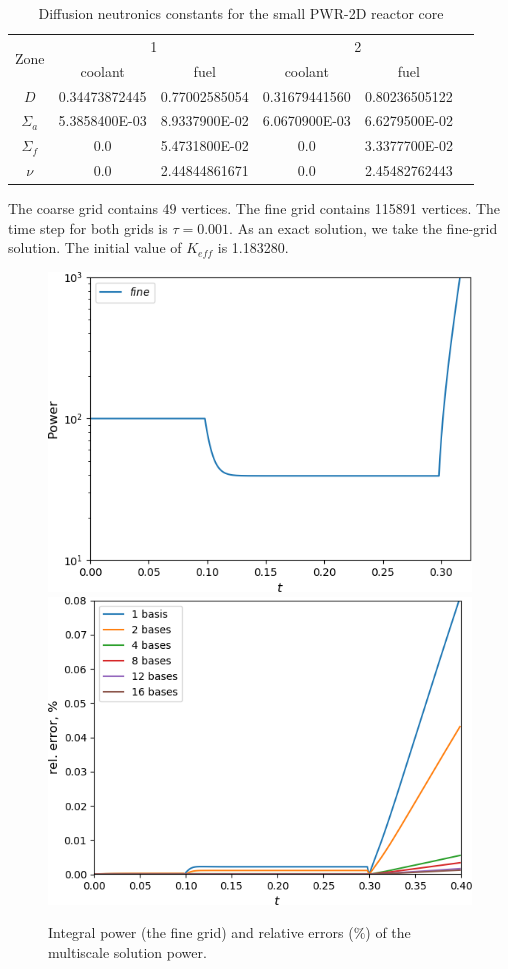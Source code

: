 \documentclass[runningheads]{llncs}
\begin{document}
\begin{table}[h]
\caption{Diffusion neutronics constants for the small PWR-2D reactor core}
\label{t1}
\begin{center}
\begin{tabular}{|c|c|c|c|c|c|}
\hline
\multirow{2}{*}{Zone} & \multicolumn{2}{c|}{1} & \multicolumn{2}{c|}{2} \\
\cline{2-5}
& coolant & fuel & coolant & fuel \\
\hline
$D$ & 0.34473872445 & 0.77002585054 & 0.31679441560 & 0.80236505122 \\
$\Sigma_a$ & 5.3858400E-03 & 8.9337900E-02 & 6.0670900E-03 & 6.6279500E-02 \\
$\Sigma_{f}$ & 0.0 & 5.4731800E-02 & 0.0 & 3.3377700E-02 \\
$\nu$ & 0.0 & 2.44844861671 & 0.0 & 2.45482762443 \\
\hline
\end{tabular}
\end{center}
\end{table}

The coarse grid contains $49$ vertices.
The fine grid contains 115891 vertices. 
The time step for both grids is $\tau = 0.001$.
As an exact solution, we take the fine-grid solution.
The initial value of $K_{eff}$ is 1.183280. 

\begin{figure}[h!]
\centering
\includegraphics[width=0.45\linewidth]{power_fine.png} 
\hspace{2em}
\includegraphics[width=0.45\linewidth]{power.png} 
\caption{Integral power (the fine grid) and relative errors ($\%$) of the multiscale solution power.}
\label{p4}
\end{figure}
 
\end{document}
